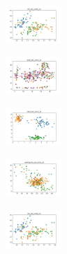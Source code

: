 \begin{figure}[H]    
    \centering
    \begin{subfigure}
        \centering
        \includegraphics[width=0.234\textwidth]{img/hs-ls/iris_set_const_10_949004259_clust.png}
    \end{subfigure}
    \hfill
    \begin{subfigure}
        \centering
        \includegraphics[width=0.234\textwidth]{img/hs-ls/ecoli_set_const_10_949004259_clust.png}
    \end{subfigure}
    \hfill
    \begin{subfigure}
        \centering
        \includegraphics[width=0.234\textwidth]{img/hs-ls/rand_set_const_10_949004259_clust.png}
    \end{subfigure}
    \hfill
    \begin{subfigure}
        \centering
        \includegraphics[width=0.234\textwidth]{img/hs-ls/newthyroid_set_const_10_949004259_clust.png}
    \end{subfigure}
    \hfill
    \begin{subfigure}
        \centering
        \includegraphics[width=0.234\textwidth]{img/hs-ls/iris_set_const_10_589741062_clust.png}
    \end{subfigure}

\end{figure}
